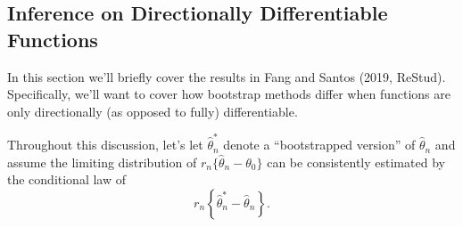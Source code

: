 \subsection{Inference on Directionally Differentiable Functions}%
\label{subsec:fang-santos-2019}

In this section we'll briefly cover the results in Fang and Santos (2019, ReStud). Specifically, we'll want to cover how bootstrap methods differ when functions are only directionally (as opposed to fully) differentiable.

Throughout this discussion, let's let \(\hat\theta_n^*\) denote a ``bootstrapped version'' of \(\hat\theta_n\) and assume the limiting distribution of \(r_n\{\hat\theta_n-\theta_0\}\) can be consistently estimated by the conditional law of 
\[
    r_n\left\{\hat\theta_n^* - \hat\theta_n\right\}
.\] 

